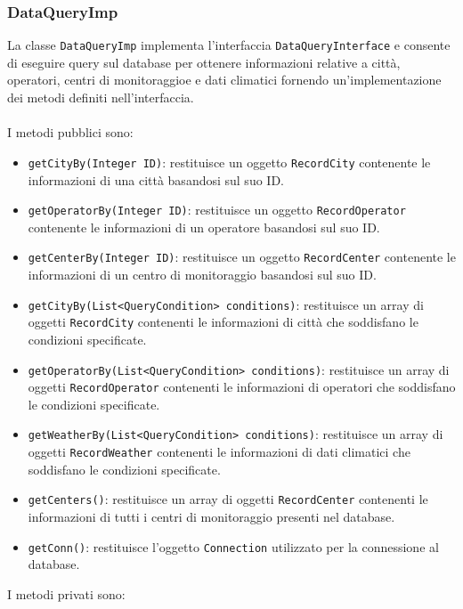 \subsubsection{DataQueryImp}
La classe \texttt{DataQueryImp} implementa l'interfaccia \texttt{DataQueryInterface} e consente di eseguire query sul database per ottenere informazioni relative a città, operatori, centri di monitoraggioe e dati climatici
fornendo un'implementazione dei metodi definiti nell'interfaccia.\\
\\
I metodi pubblici sono:
\begin{itemize}
      \item \texttt{getCityBy(Integer ID)}: restituisce un oggetto \texttt{RecordCity} contenente le informazioni di una città basandosi sul suo ID.
      \item \texttt{getOperatorBy(Integer ID)}: restituisce un oggetto \texttt{RecordOperator} contenente le informazioni di un operatore basandosi sul suo ID.
      \item \texttt{getCenterBy(Integer ID)}: restituisce un oggetto \texttt{RecordCenter} contenente le informazioni di un centro di monitoraggio basandosi sul suo ID.
      \item \texttt{getCityBy(List<QueryCondition> conditions)}: restituisce un array di oggetti \texttt{RecordCity} contenenti le informazioni di città che soddisfano le condizioni specificate.
      \item \texttt{getOperatorBy(List<QueryCondition> conditions)}: restituisce un array di oggetti \texttt{RecordOperator} contenenti le informazioni di operatori che soddisfano le condizioni specificate.
      \item \texttt{getWeatherBy(List<QueryCondition> conditions)}: restituisce un array di oggetti \texttt{RecordWeather} contenenti le informazioni di dati climatici che soddisfano le condizioni specificate.
      \item \texttt{getCenters()}: restituisce un array di oggetti \texttt{RecordCenter} contenenti le informazioni di tutti i centri di monitoraggio presenti nel database.
      \item \texttt{getConn()}: restituisce l'oggetto \texttt{Connection} utilizzato per la connessione al database.
\end{itemize}
I metodi privati sono:
